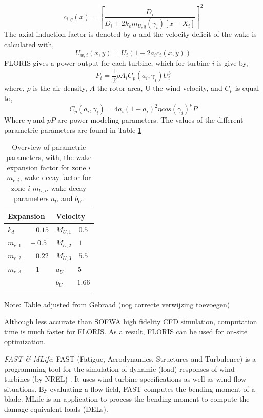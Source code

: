 \begin{equation}
\label{eq:c}
c_{i,q}(x) = \left[ \frac{D_i}{D_i + 2k_em_{U,q}(\gamma_i)[x - X_i]} \right]^2
\end{equation}
The axial induction factor is denoted by $a$ and the velocity deficit of the wake is calculated with,
\begin{equation}
\label{eq:Uw}
U_{w,i}(x,y) = U_i\left( {1-2a_ic_i(x,y)} \right)
\end{equation}
FLORIS gives a power output for each turbine, which for turbine $i$ is give by,
\begin{equation}
\label{eq:P}
P_i = \frac{1}{2} \rho A_i C_p(a_i, \gamma_i)U_i^3
\end{equation}
where, $\rho$ is the air density, $A$ the rotor area, U the wind velocity, and $C_p$ is equal to,
\begin{equation}
\label{eq:Cp}
C_p(a_i, \gamma_i) = 4a_i(1-a_i)^2 \eta cos(\gamma_i)^pP
\end{equation}
Where $\eta$ and $pP$ are power modeling parameters.
The values of the different parametric parameters are found in Table \ref{tab:para}
\begin{table}[h]
	\caption{Overview of parametric parameters, with, the wake expansion factor for zone $i$ $m_{e,i}$, wake decay factor for zone $i$ $m_{U,i}$, wake decay parameters $a_U$ and $b_U$.}
	\centering
	\begin{tabular}{ll}
		\hline
		Expansion & Velocity  \\ 
		\hline
		$k_d \qquad \quad 0.15$ & $M_{U,1} \quad 0.5$ \\
		$m_{e,1} \quad -0.5$ & $M_{U,2} \quad 1$ \\
		$m_{e,2} \qquad 0.22$ & $M_{U,3} \quad 5.5$ \\
		$m_{e,3} \qquad 1$ & $a_U \qquad 5$ \\
		& $b_U \qquad 1.66$ \\
		\hline
		\label{tab:para}
	\end{tabular}
	
	Note: Table adjusted from Gebraad \cite{Gebraad2016}(nog correcte verwijzing toevoegen)
\end{table}

Although less accurate than  SOFWA high fidelity CFD simulation, computation time is much faster for FLORIS. As a result, FLORIS can be used for on-site optimization. 

\textit{FAST \& MLife}: FAST (Fatigue, Aerodynamics, Structures and Turbulence) is a programming tool for the simulation of dynamic (load) responses of wind turbines (by NREL) \cite{Jonkman2005}. It uses wind turbine specifications as well as wind flow situations. By evaluating a flow field, FAST computes the bending moment of a blade. MLife is an application to process the bending moment to compute the damage equivalent loads (DELs). 

